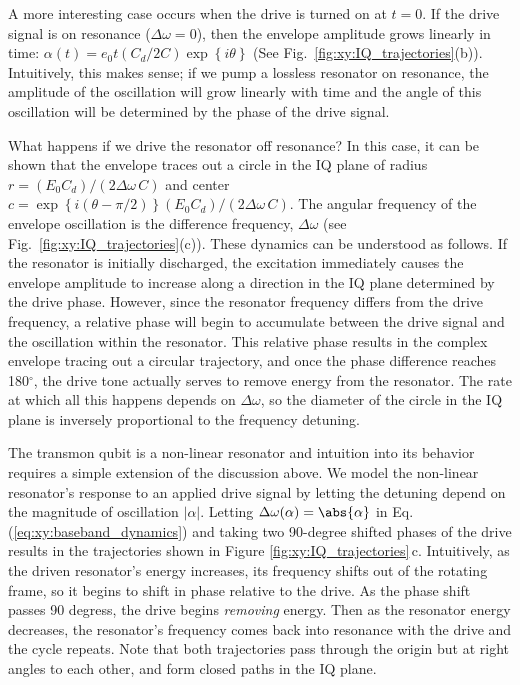 A more interesting case occurs when the drive is turned  on at $t=0$.
If the drive signal is on resonance ($\Delta\omega=0$), then the envelope amplitude grows linearly in time: $\alpha (t) = e_\text{0} t \left(C_d/ 2 C \right) \exp \left\{i\theta\right\}$ (See Fig.~\ref{fig:xy:IQ_trajectories}(b)).
Intuitively, this makes sense; if we pump a lossless resonator on resonance, the amplitude of the oscillation will grow linearly with time and the angle of this oscillation will be determined by the phase of the drive signal.

What happens if we drive the resonator off resonance?
In this case, it can be shown that the envelope traces out a circle  in the IQ plane of radius $r=\left( E_0 C_d \right) / \left(2\Delta\omega \, C\right)$ and center $c = \exp\left\{i\left(\theta - \pi/2\right)\right\} \left(E_0 C_d \right) / \left(2 \Delta\omega \, C \right)$.
The angular frequency of the envelope oscillation is the difference frequency, $\Delta\omega$ (see Fig.~\ref{fig:xy:IQ_trajectories}(c)).
These dynamics can be understood as follows.
If the resonator is initially discharged, the excitation immediately causes the envelope amplitude to increase along a direction in the IQ plane determined by the drive phase.
However, since the resonator frequency differs from the drive frequency, a relative phase will begin to accumulate between the drive signal and the oscillation within the resonator.
This relative phase results in the complex envelope tracing out a circular trajectory, and once the phase difference reaches 180$^\circ$, the drive tone actually serves to remove energy from the resonator.
The rate at which all this happens depends on $\Delta\omega$, so the diameter of the circle in the IQ plane is inversely proportional to the frequency detuning.

The transmon qubit is a non-linear resonator and intuition into its behavior requires a simple extension of the discussion above. 
We model the non-linear resonator's response to an applied drive signal by letting the detuning depend on the magnitude of oscillation $\lvert \alpha \rvert$.
 Letting $\Delta\omega(\alpha) = \abs{\alpha}$ in Eq.\,(\ref{eq:xy:baseband_dynamics}) and taking two 90-degree shifted phases of the drive results in the trajectories shown in Figure \ref{fig:xy:IQ_trajectories}\,c.
Intuitively, as the driven resonator's energy increases, its frequency shifts out of the rotating frame, so it begins to shift in phase relative to the drive.
As the phase shift passes 90 degress, the drive begins \emph{removing} energy.
Then as the resonator energy decreases, the resonator's frequency comes back into resonance with the drive and the cycle repeats.
Note that both trajectories pass through the origin but at right angles to each other, and form closed paths in the IQ plane.

